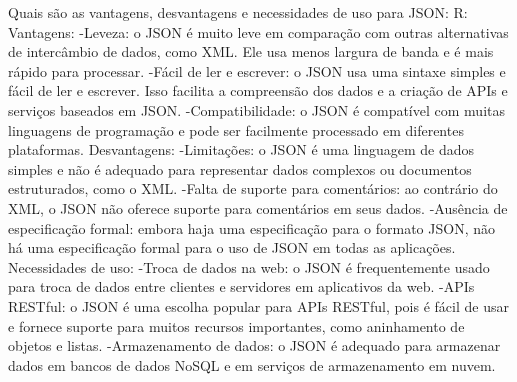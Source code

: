 Quais são as vantagens, desvantagens e necessidades de uso para JSON:
R:
Vantagens:
  -Leveza: o JSON é muito leve em comparação com outras alternativas de intercâmbio de dados, como XML. Ele usa menos largura de banda e é mais rápido para processar.
  -Fácil de ler e escrever: o JSON usa uma sintaxe simples e fácil de ler e escrever. Isso facilita a compreensão dos dados e a criação de APIs e serviços baseados em JSON.
  -Compatibilidade: o JSON é compatível com muitas linguagens de programação e pode ser facilmente processado em diferentes plataformas.
Desvantagens:
  -Limitações: o JSON é uma linguagem de dados simples e não é adequado para representar dados complexos ou documentos estruturados, como o XML.
  -Falta de suporte para comentários: ao contrário do XML, o JSON não oferece suporte para comentários em seus dados.
  -Ausência de especificação formal: embora haja uma especificação para o formato JSON, não há uma especificação formal para o uso de JSON em todas as aplicações.
Necessidades de uso:
  -Troca de dados na web: o JSON é frequentemente usado para troca de dados entre clientes e servidores em aplicativos da web.
  -APIs RESTful: o JSON é uma escolha popular para APIs RESTful, pois é fácil de usar e fornece suporte para muitos recursos importantes, como aninhamento de objetos e listas.
  -Armazenamento de dados: o JSON é adequado para armazenar dados em bancos de dados NoSQL e em serviços de armazenamento em nuvem.
